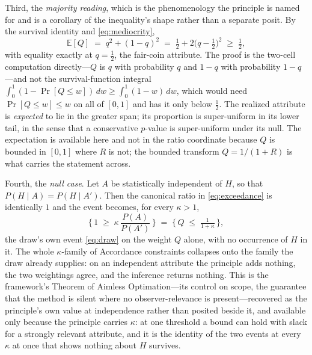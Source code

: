 Third, the \emph{majority reading}, which is the phenomenology the principle is named for and is a corollary of the inequality's shape rather than a separate posit. By the survival identity and \eqref{eq:mediocrity},
\begin{equation}
\label{eq:majority}
\mathbb{E}[Q] \;=\; q^{2} + (1-q)^{2} \;=\; \tfrac12 + 2\big(q - \tfrac12\big)^{2} \;\ge\; \tfrac12,
\end{equation}
with equality exactly at $q = \tfrac12$, the fair-coin attribute. The proof is the two-cell computation directly---$Q$ is $q$ with probability $q$ and $1-q$ with probability $1-q$---and not the survival-function integral $\int_0^1 (1 - \Pr[Q \le w])\,dw \ge \int_0^1 (1-w)\,dw$, which would need $\Pr[Q \le w] \le w$ on all of $[0,1]$ and has it only below $\tfrac12$. The realized attribute is \emph{expected} to lie in the greater span; its proportion is super-uniform in its lower tail, in the sense that a conservative $p$-value is super-uniform under its null. The expectation is available here and not in the ratio coordinate because $Q$ is bounded in $[0,1]$ where $R$ is not; the bounded transform $Q = 1/(1+R)$ is what carries the statement across.

Fourth, the \emph{null case}. Let $A$ be statistically independent of $H$, so that $P(H \mid A) = P(H \mid A')$. Then the canonical ratio in \eqref{eq:exceedance} is identically $1$ and the event becomes, for every $\kappa > 1$,
\begin{equation}
\label{eq:null-case}
\Big\{\, 1 \;\ge\; \kappa\, \frac{P(A)}{P(A')} \,\Big\} \;=\; \Big\{\, Q \;\le\; \tfrac{1}{1+\kappa} \,\Big\},
\end{equation}
the draw's own event \eqref{eq:draw} on the weight $Q$ alone, with no occurrence of $H$ in it. The whole $\kappa$-family of Accordance constraints collapses onto the family the draw already supplies: on an independent attribute the principle adds nothing, the two weightings agree, and the inference returns nothing. This is the framework's Theorem of Aimless Optimation---its control on scope, the guarantee that the method is silent where no observer-relevance is present---recovered as the principle's own value at independence rather than posited beside it, and available only because the principle carries $\kappa$: at one threshold a bound can hold with slack for a strongly relevant attribute, and it is the identity of the two events at every $\kappa$ at once that shows nothing about $H$ survives.

